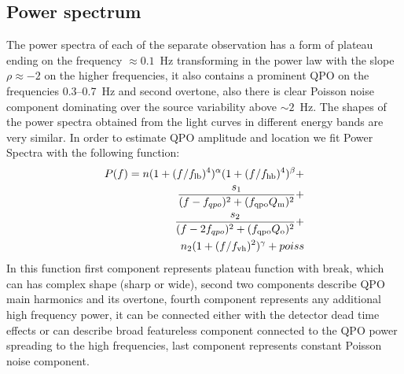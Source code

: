 \documentclass[a4paper,fleqn,usenatbib]{mnras}
\begin{document}
\subsection{Power spectrum}
    The power spectra of each of the separate observation has a form of plateau ending on the frequency $\approx0.1$~Hz transforming in the power law with the slope $\rho\approx-2$ on the higher frequencies, it also contains a prominent QPO on the frequencies 0.3--0.7~Hz and second overtone, also there is clear Poisson noise component dominating over the source variability above $\sim2$~Hz.
    The shapes of the power spectra obtained from the light curves in different energy bands are very similar.
    In order to estimate QPO amplitude and location we fit Power Spectra with the following function:
\begin{equation}
        \begin{split}
        P(f) = n (1 + (f/f_{\rm lb})^4)^{\alpha} (1 + (f/f_{\rm hb})^4)^{\beta} + \\
        \frac{s_1}{(f - f_{qpo})^2 + (f_{\rm qpo} Q_{\rm m})^2} +\\
        \frac{s_2}{(f - 2f_{qpo})^2 + (f_{\rm qpo} Q_{\rm o})^2} + \\
        n_2 (1 + (f/f_{\rm vh})^2)^{\gamma} + poiss
\end{split}
        \label{eq:complex_fit}
\end{equation}
In this function first component represents plateau function with break, which can has complex shape (sharp or wide), second two components describe QPO main harmonics and its overtone, fourth component represents any additional high frequency power, it can be connected either with the detector dead time effects or can describe broad featureless component connected to the QPO power spreading to the high frequencies, last component represents constant Poisson noise component.
\end{document}
